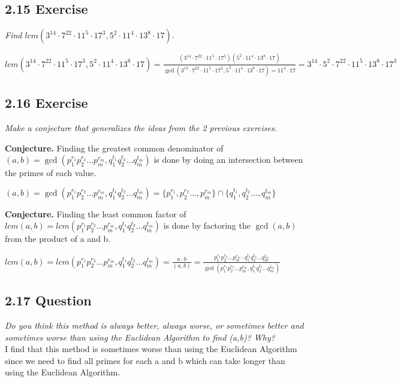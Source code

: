 \documentclass{article}
\begin{document}
\subsection*{2.15 Exercise} 
\quad \textit{Find $lcm(3^{14} \cdot 7^{22} \cdot 11^5 \cdot 17^3, 5^2 \cdot 11^4 \cdot 13^8 \cdot 17)$.}

\begin{center}
    $lcm(3^{14} \cdot 7^{22} \cdot 11^5 \cdot 17^3, 5^2 \cdot 11^4 \cdot 13^8 \cdot 17) = \frac{(3^{14} \cdot 7^{22} \cdot 11^5 \cdot 17^3)(5^2 \cdot 11^4 \cdot 13^8 \cdot 17)}{\gcd(3^{14} \cdot 7^{22} \cdot 11^5 \cdot 17^3, 5^2 \cdot 11^4 \cdot 13^8 \cdot 17) = 11^4 \cdot 17} = 3^{14} \cdot 5^2 \cdot 7^{22} \cdot 11^5 \cdot 13^8 \cdot 17^3$
\end{center}

\subsection*{2.16 Exercise} 
\quad \textit{Make a conjecture that generalizes the ideas from the 2 previous exercises.}

\textbf{Conjecture.} Finding the greatest common denominator of $(a,b) = \gcd(p_{1}^{r_1}p_{2}^{r_2}...p_{m}^{r_m}, q_{1}^{t_1}q_{2}^{t_2}...q_{m}^{t_m})$ is done by doing an intersection between the primes of each value.

\begin{center}
    $(a,b) = \gcd(p_{1}^{r_1}p_{2}^{r_2}...p_{m}^{r_m}, q_{1}^{t_1}q_{2}^{t_2}...q_{m}^{t_m}) = \{p_{1}^{r_1},p_{2}^{r_2}...,p_{m}^{r_m}\} \cap \{q_{1}^{t_1},q_{2}^{t_2}...,q_{m}^{t_m}\}$
\end{center}

\textbf{Conjecture.} Finding the least common factor of $lcm(a,b) = lcm(p_{1}^{r_1}p_{2}^{r_2}...p_{m}^{r_m}, q_{1}^{t_1}q_{2}^{t_2}...q_{m}^{t_m})$ is done by factoring the $\gcd(a,b)$ from the product of a and b.

\begin{center}
    $lcm(a,b) = lcm(p_{1}^{r_1}p_{2}^{r_2}...p_{m}^{r_m}, q_{1}^{t_1}q_{2}^{t_2}...q_{m}^{t_m}) = \frac{a \cdot b}{(a,b)}= \frac{p_{1}^{r_1}p_{2}^{r_2}...p_{m}^{r_m} \cdot q_{1}^{t_1}q_{2}^{t_2}...q_{m}^{t_m}}{\gcd(p_{1}^{r_1}p_{2}^{r_2}...p_{m}^{r_m}, q_{1}^{t_1}q_{2}^{t_2}...q_{m}^{t_m})}$
\end{center}

\subsection*{2.17 Question} 
\quad \textit{Do you think this method is always better, always worse, or sometimes better and sometimes worse than using the Euclidean Algorithm to find (a,b)? Why?}\\
I find that this method is sometimes worse than using the Euclidean Algorithm since we need to find all primes for each a and b which can take longer than using the Euclidean Algorithm.
\end{document}
